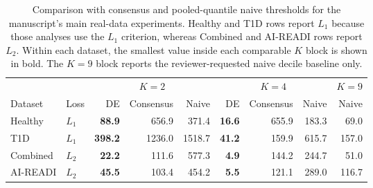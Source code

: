 \begin{table}[t]
\centering
\caption{Comparison with consensus and pooled-quantile naive thresholds for the manuscript's main real-data experiments. Healthy and T1D rows report $L_1$ because those analyses use the $L_1$ criterion, whereas Combined and AI-READI rows report $L_2$. Within each dataset, the smallest value inside each comparable $K$ block is shown in bold. The $K=9$ block reports the reviewer-requested naive decile baseline only.}
\label{tab:real_loss_comparison}
\small
\begin{tabular}{llrrrrrrr}
\toprule
 & & \multicolumn{3}{c}{$K=2$} & \multicolumn{3}{c}{$K=4$} & \multicolumn{1}{c}{$K=9$} \\
\cmidrule(lr){3-5} \cmidrule(lr){6-8} \cmidrule(lr){9-9}
Dataset & Loss & DE & Consensus & Naive & DE & Consensus & Naive & Naive \\
\midrule
Healthy & $L_1$ & \textbf{88.9} & 656.9 & 371.4 & \textbf{16.6} & 655.9 & 183.3 & 69.0 \\
\midrule
T1D & $L_1$ & \textbf{398.2} & 1236.0 & 1518.7 & \textbf{41.2} & 159.9 & 615.7 & 157.0 \\
\midrule
Combined & $L_2$ & \textbf{22.2} & 111.6 & 577.3 & \textbf{4.9} & 144.2 & 244.7 & 51.0 \\
\midrule
AI-READI & $L_2$ & \textbf{45.5} & 103.4 & 454.2 & \textbf{5.5} & 121.1 & 289.0 & 116.7 \\
\bottomrule
\end{tabular}
\end{table}